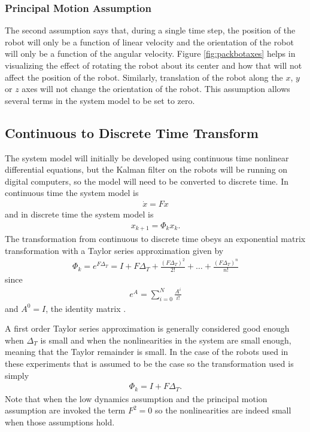 \subsubsection{Principal Motion Assumption}
\label{sec:kfPrincipalMotionAssumption}
The second assumption says that, during a single time step, the position of the robot will only be a function of linear velocity and the orientation of the robot will only be a function of the angular velocity. Figure \ref{fig:packbotaxes} helps in visualizing the effect of rotating the robot about its center and how that will not affect the position of the robot. Similarly, translation of the robot along the $x$, $y$ or $z$ axes will not change the orientation of the robot. This assumption allows several terms in the system model to be set to zero.

\subsection{Continuous to Discrete Time Transform}
\label{sec:kfContToDiscTransform}
The system model will initially be developed using continuous time nonlinear differential equations, but the Kalman filter on the robots will be running on digital computers, so the model will need to be converted to discrete time. In continuous time the system model is 
\begin{align*}
\dot{x} = Fx
\end{align*}
and in discrete time the system model is
\begin{align*}
x_{k+1} = \Phi_k x_k.
\end{align*}
The transformation from continuous to discrete time obeys an exponential matrix transformation with a Taylor series approximation given by \cite{Gelb74}
\begin{align*}
\Phi_k = e^{F\Delta_T} = I + F\Delta_T + \frac{(F\Delta_T)^2}{2!} + \ldots + \frac{(F\Delta_T)^n}{n!}
\end{align*}
since
\begin{align*}
e^A = \sum_{i=0}^N \frac{A^i}{i!}
\end{align*}
and $A^0=I$, the identity matrix \cite{Phadke99}.

A first order Taylor series approximation is generally considered good enough when $\Delta_T$ is small and when the nonlinearities in the system are small enough, meaning that the Taylor remainder is small. In the case of the robots used in these experiments that is assumed to be the case so the transformation used is simply
\begin{align}
\label{eq:kfContToDiscTransform}
\Phi_k = I + F\Delta_T.
\end{align}
Note that when the low dynamics assumption and the principal motion assumption are invoked the term $F^2=0$ so the nonlinearities are indeed small when those assumptions hold.

